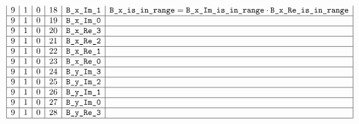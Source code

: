 \begin{figure}[h!]
\begin{adjustwidth}{-2cm}{-2cm}
\[\begin{array}{|c|c|c|c|c|c|c|}
                9 & 1      & 0      & 18          & \texttt{B\_x\_Im\_1}               & \texttt{B}\texttt{\_x}\texttt{\_is\_in\_range} =   \texttt{B}\texttt{\_x}\texttt{\_Im}\texttt{\_is\_in\_range} \cdot \texttt{B}\texttt{\_x}\texttt{\_Re}\texttt{\_is\_in\_range}                                                                 \\ \hline
                9 & 1      & 0      & 19          & \texttt{B\_x\_Im\_0}              &                                                                                                                               \\ \hline
                9 & 1      & 0      & 20          & \texttt{B\_x\_Re\_3}             &                                                                                                                               \\ \hline
                9 & 1      & 0      & 21          & \texttt{B\_x\_Re\_2}               &                                                                                                                               \\ \hline
                9 & 1      & 0      & 22          & \texttt{B\_x\_Re\_1}               &                                                                                                                               \\ \hline
                9 & 1      & 0      & 23          & \texttt{B\_x\_Re\_0}              &                                                                                                                               \\ \hline
                9 & 1      & 0      & 24          & \texttt{B\_y\_Im\_3}             &                                                                                                                               \\ \hline
                9 & 1      & 0      & 25          & \texttt{B\_y\_Im\_2}               &                                                                                                                               \\ \hline
                9 & 1      & 0      & 26          & \texttt{B\_y\_Im\_1}               &                                                                                                                               \\ \hline
                9 & 1      & 0      & 27          & \texttt{B\_y\_Im\_0}              &                                                                                                                               \\ \hline
                9 & 1      & 0      & 28          & \texttt{B\_y\_Re\_3}             &                                                                                                                               \\ \hline

\end{array}\]
\end{adjustwidth}
\end{figure}
